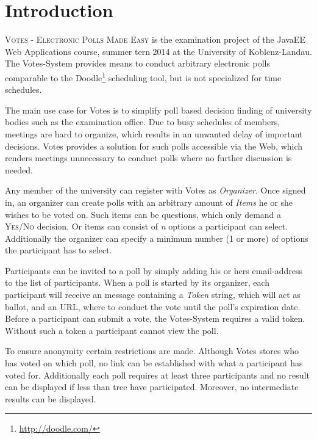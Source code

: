 \section{Introduction}
\textsc{Votes - Electronic Polls Made Easy} is the examination project of the JavaEE Web Applications course, summer tern 2014 at the University of Koblenz-Landau.
The Votes-System provides means to conduct arbitrary electronic polls comparable to the Doodle\footnote{\url{http://doodle.com/}} scheduling tool, but is not specialized for time schedules.

The main use case for Votes is to simplify poll based decision finding of university bodies such as the examination office.
Due to busy schedules of members, meetings are hard to organize, which results in an unwanted delay of important decisions.
Votes provides a solution for such polls accessible via the Web, which renders meetings unnecessary to conduct polls where no further discussion is needed.

Any member of the university can register with Votes as \textit{Organizer}.
Once signed in, an organizer can create polls with an arbitrary amount of \textit{Items} he or she wishes to be voted on.
Such items can be questions, which only demand a \textsc{Yes/No} decision.
Or items can consist of \textit{n} options a participant can select.
Additionally the organizer can specify a minimum number (1 or more) of options the participant has to select.

Participants can be invited to a poll by simply adding his or hers email-address to the list of participants.
When a poll is started by its organizer, each participant will receive an message containing a \textit{Token} string, which will act as ballot, and an URL, where to conduct the vote until the poll's expiration date.
Before a participant can submit a vote, the Votes-System requires a valid token.
Without such a token a participant cannot view the poll.

To ensure anonymity certain restrictions are made.
Although Votes stores who has voted on which poll, no link can be established with what a participant has voted for.
Additionally each poll requires at least three participants and no result can be displayed if less than tree have participated.
Moreover, no intermediate results can be displayed.
